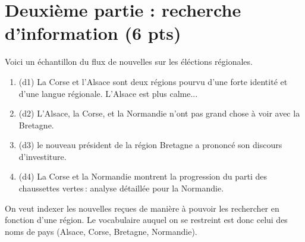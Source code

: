 \documentclass[11pt,a4paper]{article}
\newenvironment{solution}[0]{
~\\ \color{red} \textbf{Solution : }\color{black}}{%
}
\begin{document}

\section*{Deuxième partie : recherche d'information (6 pts)}


Voici un échantillon du flux de nouvelles sur les éléctions régionales. 

\begin{enumerate}
 \item (d1) La Corse et l'Alsace sont deux régions pourvu d'une forte identité
     et d'une langue régionale. L'Alsace est plus calme...
        \item (d2) L'Alsace, la Corse, et la Normandie n'ont pas grand chose à voir avec la Bretagne.
        \item (d3) le nouveau président de la région Bretagne
                a prononcé son discours d'investiture.
           \item (d4) La Corse et la Normandie montrent la progression du parti 
                 des chaussettes vertes\,: analyse détaillée pour la Normandie.
\end{enumerate}

On veut indexer les nouvelles reçues de manière à pouvoir les rechercher
en fonction d'une région. Le vocabulaire auquel on se restreint est donc celui
des noms de pays (Alsace, Corse, Bretagne, Normandie).

\smallskip
\end{document}
